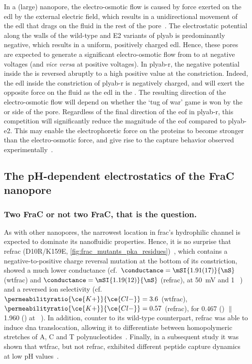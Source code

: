 In a (large) nanopore, the electro-osmotic flow is caused by force exerted on the \gls{edl} by the external
electric field, which results in a unidirectional movement of the \gls{edl} that drags on the fluid in the
rest of the pore~\cite{Qiao-Aluru-2003,Mao-2014,Tagliazucchi-2015,Bonome-2017}. The electrostatic potential
along the walls of the wild-type and E2 variants of \gls{plyab} is predominantly negative, which results in a
uniform, positively charged \gls{edl}. Hence, these pores are expected to generate a significant
electro-osmotic flow from \cisi{} to \transi{} at negative voltages (and \textit{vice versa} at positive
voltages). In \gls{plyab-r}, the negative potential inside the \transi{} \lumen{} is reversed abruptly to a
high positive value at the \cisi{} constriction. Indeed, the \gls{edl} inside the constriction of
\gls{plyab-r} is negatively charged, and will exert the opposite force on the fluid as the \gls{edl} in the
\transi{} \lumen{}. The resulting direction of the electro-osmotic flow will depend on whether the `tug of
war' game is won by the \cisi{} or \transi{} side of the pore. Regardless of the final direction of the
\gls{eof} in \gls{plyab-r}, this competition will significantly reduce the magnitude of the \gls{eof} compared
to \gls{plyab-e2}. This may enable the electrophoretic force on the proteins to become stronger than the
electro-osmotic force, and give rise to the capture behavior observed experimentally~\cite{Huang-2020}.





\subsection{The {pH}-dependent electrostatics of the FraC nanopore}
%
\label{sec:elec:frac}
%

\subsubsection{Two FraC or not two FraC, that is the question.}
%
As with other nanopores, the narrowest location in \gls{frac}'s hydrophilic channel is expected to dominate
its nanofluidic properties. Hence, it is no surprise that \gls{refrac} (D10R/K159E,
\cref{fig:frac_mutants_pka_residues})~\cite{Wloka-2016}, which contains a negative-to-positive charge reversal
mutation at the bottom of its constriction, showed a much lower conductance (cf.~$\conductance =
\mSI{1.91(17)}{\nS}$ (\gls{wtfrac}) and $\conductance = \mSI{1.19(12)}{\nS}$ (\gls{refrac}), at \SI{+50}{mV}
and \SI{1}{\Molar} ~\cite{Wloka-2016}) and a reversed ion selectivity
(cf.~$\permeabilityratio{\ce{K+}}{\ce{Cl-}} = 3.6$ (\gls{wtfrac}), $\permeabilityratio{\ce{K+}}{\ce{Cl-}} =
0.57$ (\gls{refrac}), for \SI{0.467}{\Molar}  (\cisi) $\|$ \SI{1.960}{\Molar}  (\transi) at
~\cite{Huang-2017}). In addition, counter to its wild-type counterpart, \gls{refrac} was able to
induce \gls{dna} translocation, allowing it to differentiate between homopolymeric stretches of A, C and T
polynucleotides~\cite{Wloka-2016}. Finally, in a subsequent study it was shown that \gls{wtfrac}, but not
\gls{refrac}, exhibited different peptide capture dynamics at low pH values~\cite{Huang-2017}.

